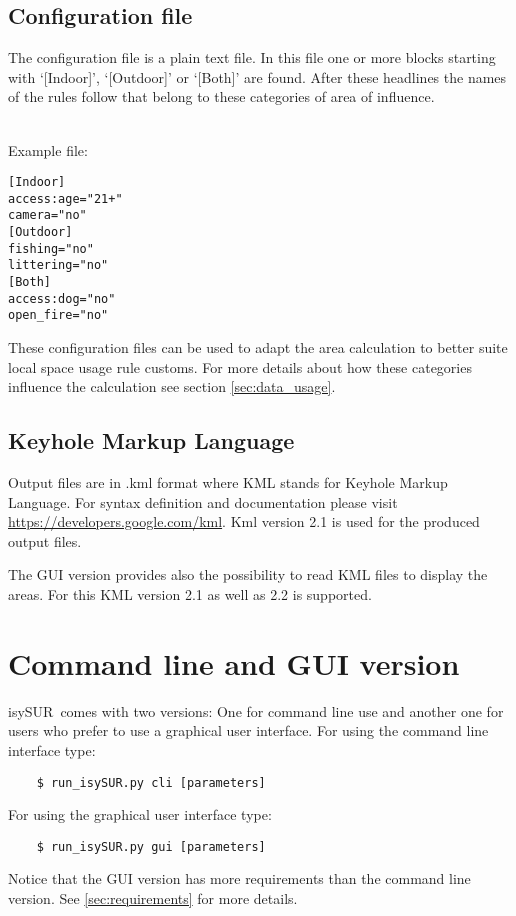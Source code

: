 \documentclass[11pt,fleqn]{book} %
\newcommand{\ProjectTitle}{isySUR}
\newcommand{\pt}{\ProjectTitle}
\begin{document}
\subsection{Configuration file}\label{sec:confinput}
The configuration file is a plain text file. In this file one or more blocks starting with `[Indoor]', `[Outdoor]' or `[Both]' are found. After these headlines the names of the rules follow that belong to these categories of area of influence.
\\~

Example file:
\begin{verbatim}
[Indoor]
access:age="21+"
camera="no"
[Outdoor]
fishing="no"
littering="no"
[Both]
access:dog="no"
open_fire="no"
\end{verbatim}

These configuration files can be used to adapt the area calculation to better suite local space usage rule customs. For more details about how these categories influence the calculation see section \ref{sec:data_usage}.

\subsection{Keyhole Markup Language}
Output files are in .kml format where KML stands for Keyhole Markup Language. For syntax definition and documentation please visit \url{https://developers.google.com/kml}. Kml version 2.1 is used for the produced output files.

The GUI version provides also the possibility to read KML files to display the areas. For this KML version 2.1 as well as 2.2 is supported.

\section{Command line and GUI version}\label{sec:usage}
\pt\ comes with two versions: One for command line use and another one for users who prefer to use a graphical user interface.
For using the command line interface type:
\begin{verbatim}
	$ run_isySUR.py cli [parameters]
\end{verbatim}
For using the graphical user interface type:
\begin{verbatim}
	$ run_isySUR.py gui [parameters]
\end{verbatim}

Notice that the GUI version has more requirements than the command line version. See \ref{sec:requirements} for more details.
\end{document}
